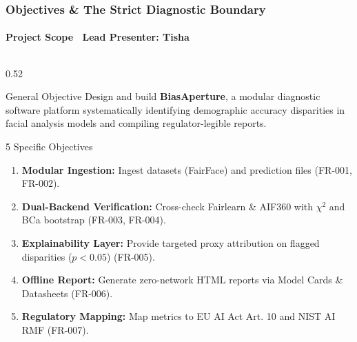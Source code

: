 \begin{frame}
  \frametitle{Objectives \& The Strict Diagnostic Boundary}
  \framesubtitle{Project Scope \textbar\ Lead Presenter: Tisha}

  \begin{columns}[T]
    \begin{column}{0.52\textwidth}
      \begin{card}{General Objective}
        \scriptsize Design and build \textbf{BiasAperture}, a modular diagnostic software platform systematically identifying demographic accuracy disparities in facial analysis models and compiling regulator-legible reports.
      \end{card}
      
      \vspace{0.1cm}
      \begin{card}{5 Specific Objectives}
        \scriptsize
        \begin{enumerate}\scriptsize
          \item \textbf{Modular Ingestion:} Ingest datasets (FairFace) and prediction files (FR-001, FR-002).
          \item \textbf{Dual-Backend Verification:} Cross-check Fairlearn \& AIF360 with $\chi^2$ and BCa bootstrap (FR-003, FR-004).
          \item \textbf{Explainability Layer:} Provide targeted proxy attribution on flagged disparities ($p < 0.05$) (FR-005).
          \item \textbf{Offline Report:} Generate zero-network HTML reports via Model Cards \& Datasheets (FR-006).
          \item \textbf{Regulatory Mapping:} Map metrics to EU AI Act Art. 10 and NIST AI RMF (FR-007).
        \end{enumerate}
      \end{card}
    \end{column}


\end{columns}
\end{frame}
